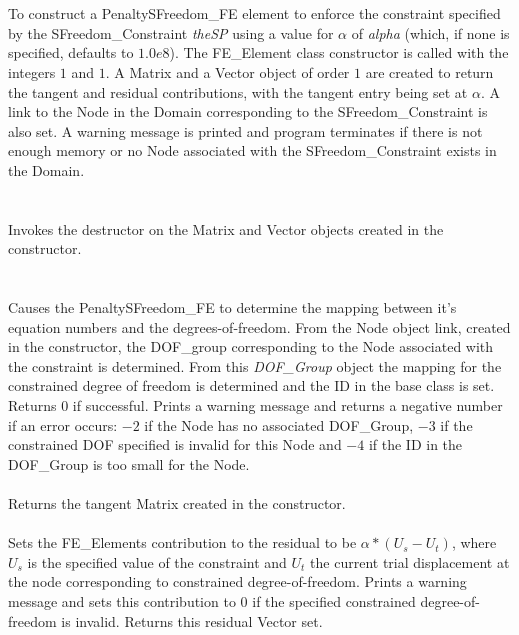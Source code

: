   \\
\\
To construct a PenaltySFreedom\_FE element to enforce the constraint
specified by the SFreedom\_Constraint {\em theSP} using a value for
$\alpha$ of {\em alpha} (which, if none is specified, defaults to
$1.0e8$). The FE\_Element class constructor is called with 
the integers $1$ and $1$. A Matrix and a Vector object of order $1$
are created to return the tangent and residual contributions, with the
tangent entry being set at $\alpha$. A link to the Node in the  Domain
corresponding to the SFreedom\_Constraint is also set. A warning message is
printed and program terminates if there is not enough memory or no
Node associated with the SFreedom\_Constraint exists in the Domain.\\

  \\
  \\
Invokes the destructor on the Matrix and Vector objects created in the
constructor. \\

  \\
 \\
Causes the PenaltySFreedom\_FE to determine the mapping between it's equation
numbers and the degrees-of-freedom. From the Node object link, created
in the constructor, the DOF\_group corresponding to the Node
associated with the constraint is determined. From this {\em
DOF\_Group} object the mapping for the constrained degree of freedom
is determined and the ID in the base class is set. Returns $0$ if
successful. Prints a warning message and returns a negative number if
an error occurs: $-2$ if the
Node has no associated DOF\_Group, $-3$ if the constrained DOF
specified is invalid for this Node and $-4$ if the ID in the
DOF\_Group is too small for the Node. \\ 

 \\
Returns the tangent Matrix created in the constructor. \\

 \\
Sets the FE\_Elements contribution to the residual to be
$\alpha * (U_s - U_t)$, where $U_s$ is the specified value of the
constraint and $U_t$ the current trial displacement at the node
corresponding to constrained degree-of-freedom. Prints a warning
message and sets this contribution to $0$ if the specified constrained
degree-of-freedom is invalid. Returns this residual Vector set.



